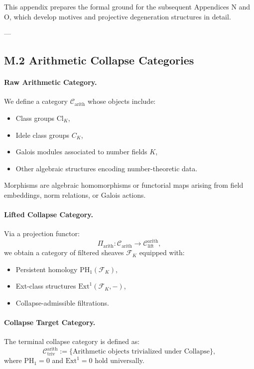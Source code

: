 \documentclass[11pt]{article}
\begin{document}
This appendix prepares the formal ground for the subsequent Appendices N and O, which develop motives and projective degeneration structures in detail.

---

\subsection*{M.2 Arithmetic Collapse Categories}

\paragraph{Raw Arithmetic Category.}
We define a category \( \mathcal{C}_{\mathrm{arith}} \) whose objects include:
\begin{itemize}
  \item Class groups \( \mathrm{Cl}_K \),
  \item Idele class groups \( C_K \),
  \item Galois modules associated to number fields \( K \),
  \item Other algebraic structures encoding number-theoretic data.
\end{itemize}

Morphisms are algebraic homomorphisms or functorial maps arising from field embeddings, norm relations, or Galois actions.

\paragraph{Lifted Collapse Category.}
Via a projection functor:
\[
\Pi_{\mathrm{arith}} : \mathcal{C}_{\mathrm{arith}} \longrightarrow \mathcal{C}_{\mathrm{lift}}^{\mathrm{arith}},
\]
we obtain a category of filtered sheaves \( \mathcal{F}_K \) equipped with:
\begin{itemize}
  \item Persistent homology \( \mathrm{PH}_1(\mathcal{F}_K) \),
  \item Ext-class structures \( \mathrm{Ext}^1(\mathcal{F}_K, -) \),
  \item Collapse-admissible filtrations.
\end{itemize}

\paragraph{Collapse Target Category.}
The terminal collapse category is defined as:
\[
\mathcal{C}_{\mathrm{triv}}^{\mathrm{arith}} := \{ \text{Arithmetic objects trivialized under Collapse} \},
\]
where \( \mathrm{PH}_1 = 0 \) and \( \mathrm{Ext}^1 = 0 \) hold universally.
\end{document}
